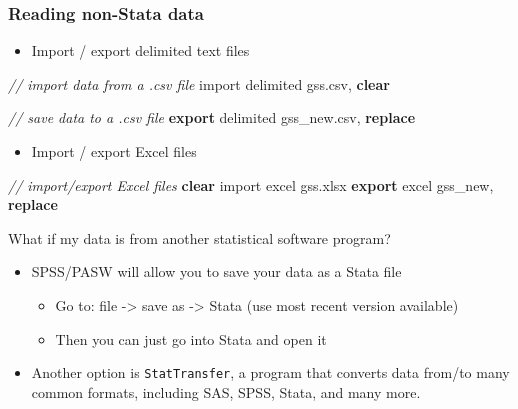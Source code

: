 \documentclass[
]{book}
\newenvironment{Shaded}{\begin{snugshade}}{\end{snugshade}}
\newcommand{\CommentTok}[1]{\textcolor[rgb]{0.56,0.35,0.01}{\textit{#1}}}
\newcommand{\KeywordTok}[1]{\textcolor[rgb]{0.13,0.29,0.53}{\textbf{#1}}}
\newcommand{\NormalTok}[1]{#1}
\providecommand{\tightlist}{%
  \setlength{\itemsep}{0pt}\setlength{\parskip}{0pt}}
\begin{document}
\hypertarget{reading-non-stata-data}{%
\subsubsection{Reading non-Stata data}\label{reading-non-stata-data}}

\begin{itemize}
\tightlist
\item
  Import / export delimited text files
\end{itemize}

\begin{Shaded}
\begin{Highlighting}[]
\CommentTok{// import data from a .csv file}
\NormalTok{import delimited gss.csv, }\KeywordTok{clear}

\CommentTok{// save data to a .csv file}
\KeywordTok{export}\NormalTok{ delimited gss\_new.csv, }\KeywordTok{replace}
\end{Highlighting}
\end{Shaded}

\begin{itemize}
\tightlist
\item
  Import / export Excel files
\end{itemize}

\begin{Shaded}
\begin{Highlighting}[]
\CommentTok{// import/export Excel files}
\KeywordTok{clear}
\NormalTok{import excel gss.xlsx}
\KeywordTok{export}\NormalTok{ excel gss\_new, }\KeywordTok{replace}
\end{Highlighting}
\end{Shaded}

What if my data is from another statistical software program?

\begin{itemize}
\tightlist
\item
  SPSS/PASW will allow you to save your data as a Stata file

  \begin{itemize}
  \tightlist
  \item
    Go to: file -\textgreater{} save as -\textgreater{} Stata (use most recent version available)
  \item
    Then you can just go into Stata and open it
  \end{itemize}
\item
  Another option is \texttt{StatTransfer}, a program that converts data from/to many common formats, including SAS, SPSS, Stata, and many more.
\end{itemize}
\end{document}
